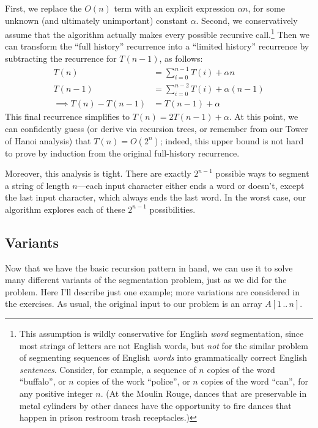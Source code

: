 First, we replace the $O(n)$ term with an explicit expression $\alpha n$, for some unknown (and ultimately unimportant) constant $\alpha$.
Second, we conservatively assume that the algorithm actually makes every possible recursive call.\footnote{This assumption is wildly conservative for English \textit{word} segmentation, since most strings of letters are not English words, but \textit{not} for the similar problem of segmenting sequences of English \textit{words} into grammatically correct English \textit{sentences}. Consider, for example, a sequence of $n$ copies of the word “buffalo”, or $n$ copies of the work “police”, or $n$ copies of the word “can”, for any positive integer $n$. (At the Moulin Rouge, dances that are preservable in metal cylinders by other dances have the opportunity to fire dances that happen in prison restroom trash receptacles.)}
Then we can transform the “full history” recurrence into a “limited history” recurrence by subtracting the recurrence for $T(n-1)$, as follows:
\begin{align*}
T(n) &= \sum_{i=0}^{n-1} T(i) + \alpha n\\
T(n-1) &= \sum_{i=0}^{n-2} T(i) + \alpha(n-1)\\
\implies T(n) - T(n-1) &= T(n-1) + \alpha
\end{align*}
This final recurrence simplifies to $T(n) = 2T(n-1) + \alpha$.
At this point, we can confidently guess (or derive via recursion trees, or remember from our Tower of Hanoi analysis) that $T(n) = O(2^n)$; indeed, this upper bound is not hard to prove by induction from the original full-history recurrence.

Moreover, this analysis is tight.
There are exactly $2^{n-1}$ possible ways to segment a string of length $n$---each input character either ends a word or doesn’t, except the last input character, which always ends the last word.
In the worst case, our  algorithm explores each of these $2^{n-1}$ possibilities.

\subsection{Variants}

Now that we have the basic recursion pattern in hand, we can use it to solve many different variants of the segmentation problem, just as we did for the  problem.
Here I’ll describe just one example; more variations are considered in the exercises.
As usual, the original input to our problem is an array $A[1\,..\,n]$.

